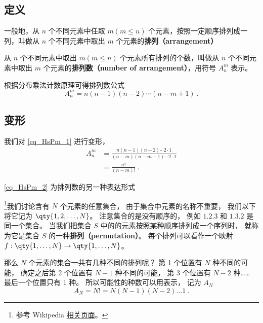 
\begin{issues}
\end{issues}


\subsection{定义}
一般地，从 $n$ 个不同元素中任取 $m(m \leq n)$ 个元素，按照一定顺序排列成一列，叫做从 $n$ 个不同元素中取出 $m$ 个元素的\textbf{排列（arrangement）}

从 $n$ 个不同元素中取出 $m(m \leq n)$ 个元素所有排列的个数，叫做从 $n$ 个不同元素中取出 $m$ 个元素的\textbf{排列数（number of arrangement）}，用符号 $A_n^m$ 表示。

根据分布乘法计数原理可得排列数公式\begin{equation}\label{eq_HsPm_1}
A_n^m = n (n - 1)(n - 2) \cdots (n - m + 1)~.
\end{equation}

\subsection{变形}
我们对 \autoref{eq_HsPm_1} 进行变形，\begin{equation}\label{eq_HsPm_2}
\begin{aligned}
A_n^m &= \frac{n(n - 1)(n - 2) \cdots 2 \cdot 1}{(n - m)(n - m - 1) \cdots 2 \cdot 1}\\
&= \frac{n!}{(n - m)!}~.
\end{aligned}
\end{equation}

\autoref{eq_HsPm_2} 为排列数的另一种表达形式





\footnote{参考 Wikipedia \href{https://en.wikipedia.org/wiki/Permutation}{相关页面}。}我们讨论含有 $N$ 个元素的任意集合， 由于集合中元素的名称不重要， 我们以下将它记为 $\qty{1,2,\dots, N}$。 注意集合的是没有顺序的， 例如 $\qty{1,2,3}$ 和 $\qty{1,3,2}$ 是同一个集合。 当我们把集合 $S$ 中的的元素按照某种顺序排列成一个序列时， 就称为它是集合 $S$ 的一种\textbf{排列（permutation）}。 每个排列可以看作一个映射 $f:\qty{1,\dots,N}\to\qty{1,\dots,N}$。

那么 $N$ 个元素的集合一共有几种不同的排列呢？ 第 1 个位置有 $N$ 种不同的可能， 确定之后第 2 个位置有 $N-1$ 种不同的可能， 第 3 个位置有 $N-2$ 种…… 最后一个位置只有 1 种。 所以可能性的种数可以用表示， 记为 $A_N$
\begin{equation}
A_N = N! = N(N-1)(N-2)\dots 1~.
\end{equation}

